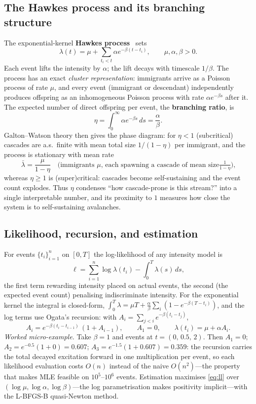 \documentclass[11pt,a4paper]{report}
\newcommand{\keyword}[1]{\textbf{\color{accent2}#1}}
\begin{document}
\subsection{The Hawkes process and its branching structure}
The exponential-kernel \keyword{Hawkes process}~\cite{hawkes} sets
\begin{equation}
\lambda(t)=\mu+\sum_{t_i<t}\alpha e^{-\beta(t-t_i)},\qquad
\mu,\alpha,\beta>0 .
\label{eq:hawkes}
\end{equation}
Each event lifts the intensity by $\alpha$; the lift decays with timescale
$1/\beta$. The process has an exact \emph{cluster representation}:
immigrants arrive as a Poisson process of rate $\mu$, and every event
(immigrant or descendant) independently produces offspring as an
inhomogeneous Poisson process with rate $\alpha e^{-\beta s}$ after it. The
expected number of direct offspring per event, the \keyword{branching
ratio}, is
\begin{equation}
\eta=\int_0^\infty\alpha e^{-\beta s}\,ds=\frac{\alpha}{\beta}.
\end{equation}
Galton--Watson theory then gives the phase diagram: for $\eta<1$
(subcritical) cascades are a.s.\ finite with mean total size
$1/(1-\eta)$ per immigrant, and the process is stationary with mean rate
\[
\bar\lambda=\frac{\mu}{1-\eta}
\quad\text{(immigrants $\mu$, each spawning a cascade of mean size
$\tfrac{1}{1-\eta}$),}
\]
whereas $\eta\ge1$ is (super)critical: cascades become self-sustaining and
the event count explodes. Thus $\eta$ condenses ``how cascade-prone is this
stream?'' into a single interpretable number, and its proximity to $1$
measures how close the system is to self-sustaining avalanches.

\subsection{Likelihood, recursion, and estimation}
For events $\{t_i\}_{i=1}^n$ on $[0,T]$ the log-likelihood of any intensity
model is
\begin{equation}
\ell=\sum_{i=1}^n\log\lambda(t_i)-\int_0^T\lambda(s)\,ds ,
\label{eq:ll}
\end{equation}
the first term rewarding intensity placed on actual events, the second
(the expected event count) penalising indiscriminate intensity. For the
exponential kernel the integral is closed-form,
$\int_0^T\lambda=\mu T+\frac{\alpha}{\beta}\sum_i(1-e^{-\beta(T-t_i)})$,
and the log terms use Ogata's recursion: with
$A_i=\sum_{j<i}e^{-\beta(t_i-t_j)}$,
\begin{equation}
A_i=e^{-\beta(t_i-t_{i-1})}\,(1+A_{i-1}),\qquad A_1=0,\qquad
\lambda(t_i)=\mu+\alpha A_i .
\label{eq:recursion}
\end{equation}
\emph{Worked micro-example.} Take $\beta=1$ and events at
$t=(0,\,0.5,\,2)$. Then $A_1=0$;
$A_2=e^{-0.5}(1+0)=0.607$;
$A_3=e^{-1.5}(1+0.607)=0.359$: the recursion carries the total decayed
excitation forward in one multiplication per event, so each likelihood
evaluation costs $O(n)$ instead of the naive $O(n^2)$---the property that
makes MLE feasible on $10^5$--$10^6$ events. Estimation maximises
\eqref{eq:ll} over $(\log\mu,\log\alpha,\log\beta)$---the log
parametrisation makes positivity implicit---with the L-BFGS-B quasi-Newton
method.
\end{document}
